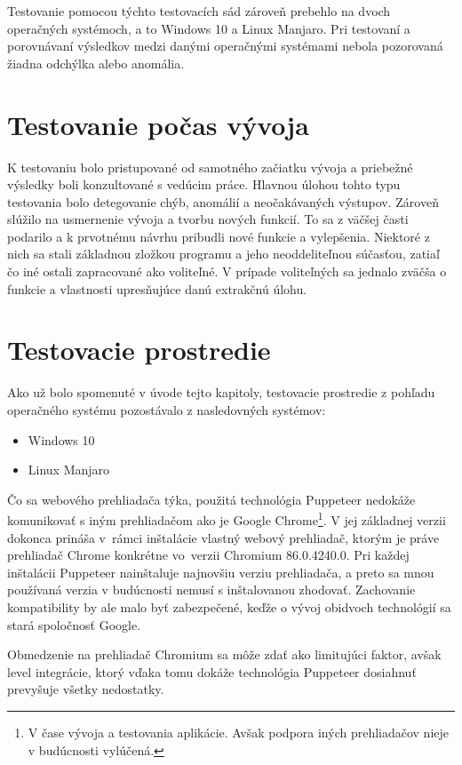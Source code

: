 Testovanie pomocou týchto testovacích sád zároveň prebehlo na dvoch operačných systémoch, a to Windows 10 a Linux Manjaro. Pri testovaní a porovnávaní výsledkov medzi danými operačnými systémami nebola pozorovaná žiadna odchýlka alebo anomália. 

\section{Testovanie počas vývoja}

K testovaniu bolo pristupované od samotného začiatku vývoja a priebežné výsledky boli konzultované s vedúcim práce. Hlavnou úlohou tohto typu testovania bolo detegovanie chýb, anomálií a neočakávaných výstupov. Zároveň slúžilo na usmernenie vývoja a tvorbu nových funkcií. To sa z väčšej časti podarilo a k prvotnému návrhu pribudli nové funkcie a vylepšenia. Niektoré z nich sa stali základnou zložkou programu a jeho neoddeliteľnou súčasťou, zatiaľ čo iné ostali zapracované ako voliteľné. V prípade voliteľných sa jednalo zväčša o funkcie a vlastnosti upresňujúce danú extrakčnú úlohu.

\section{Testovacie prostredie}

Ako už bolo spomenuté v úvode tejto kapitoly, testovacie prostredie z pohľadu operačného systému pozostávalo z nasledovných systémov:

\begin{itemize}
    \item Windows 10
    \item Linux Manjaro
\end{itemize}

\newpage

Čo sa webového prehliadača týka, použitá technológia Puppeteer nedokáže komunikovať s iným prehliadačom ako je Google Chrome\footnote{V čase vývoja a testovania aplikácie. Avšak podpora iných prehliadačov nieje v budúcnosti vylúčená.}. V jej základnej verzii dokonca prináša v~rámci inštalácie vlastný webový prehliadač, ktorým je práve prehliadač Chrome konkrétne vo~verzii Chromium 86.0.4240.0. Pri každej inštalácii Puppeteer nainštaluje najnovšiu verziu prehliadača, a preto sa mnou používaná verzia v budúcnosti nemusí s inštalovanou zhodovať. Zachovanie kompatibility by ale malo byť zabezpečené, keďže o vývoj obidvoch technológií sa stará spoločnosť Google.

Obmedzenie na prehliadač Chromium sa môže zdať ako limitujúci faktor, avšak level integrácie, ktorý vďaka tomu dokáže technológia Puppeteer dosiahnuť prevyšuje všetky nedostatky.

